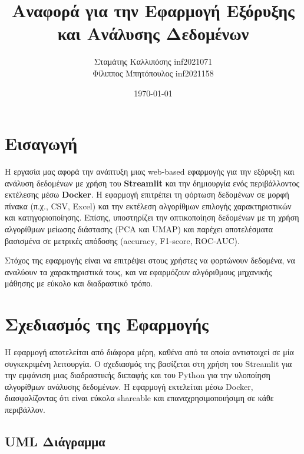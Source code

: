 \documentclass[a4paper,12pt]{article}
\title{Αναφορά για την Εφαρμογή Εξόρυξης και Ανάλυσης Δεδομένων}
\author{Σταμάτης Καλλιπόσης \textlatin{inf2021071} \\ Φίλιππος Μπητόπουλος \textlatin{inf2021158} }
\date{\today}
\begin{document}
\maketitle

\tableofcontents

\newpage

\section{Εισαγωγή}

Η εργασία μας αφορά την ανάπτυξη μιας \textlatin{web-based} εφαρμογής για την εξόρυξη και ανάλυση δεδομένων με χρήση του \textbf{\textlatin{Streamlit}} και την δημιουργία ενός περιβάλλοντος εκτέλεσης μέσω \textbf{\textlatin{Docker}}. Η εφαρμογή επιτρέπει τη φόρτωση δεδομένων σε μορφή πίνακα (π.χ., \textlatin{CSV}, \textlatin{Excel}) και την εκτέλεση αλγορίθμων επιλογής χαρακτηριστικών και κατηγοριοποίησης. Επίσης, υποστηρίζει την οπτικοποίηση δεδομένων με τη χρήση αλγορίθμων μείωσης διάστασης (\textlatin{PCA} και \textlatin{UMAP}) και παρέχει αποτελέσματα βασισμένα σε μετρικές απόδοσης (\textlatin{accuracy}, \textlatin{F1-score}, \textlatin{ROC-AUC}).

Στόχος της εφαρμογής είναι να επιτρέψει στους χρήστες να φορτώνουν δεδομένα, να αναλύουν τα χαρακτηριστικά τους, και να εφαρμόζουν αλγόριθμους μηχανικής μάθησης με εύκολο και διαδραστικό τρόπο.

\section{Σχεδιασμός της Εφαρμογής}

Η εφαρμογή αποτελείται από διάφορα μέρη, καθένα από τα οποία αντιστοιχεί σε μία συγκεκριμένη λειτουργία. Ο σχεδιασμός της βασίζεται στη χρήση του \textlatin{Streamlit} για την εμφάνιση μιας διαδραστικής διεπαφής και του \textlatin{Python} για την υλοποίηση αλγορίθμων ανάλυσης δεδομένων. Η εφαρμογή εκτελείται μέσω \textlatin{Docker}, διασφαλίζοντας ότι είναι εύκολα \textlatin{shareable} και επαναχρησιμοποιήσιμη σε κάθε περιβάλλον.

\subsection{\textlatin{UML} Διάγραμμα}
\end{document}
